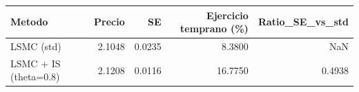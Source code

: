 \begin{tabular}{lrrrr}
\toprule
Metodo & Precio & SE & Ejercicio temprano (\%) & Ratio\_SE\_vs\_std \\
\midrule
LSMC (std) & 2.1048 & 0.0235 & 8.3800 & NaN \\
LSMC + IS (theta=0.8) & 2.1208 & 0.0116 & 16.7750 & 0.4938 \\
\bottomrule
\end{tabular}
